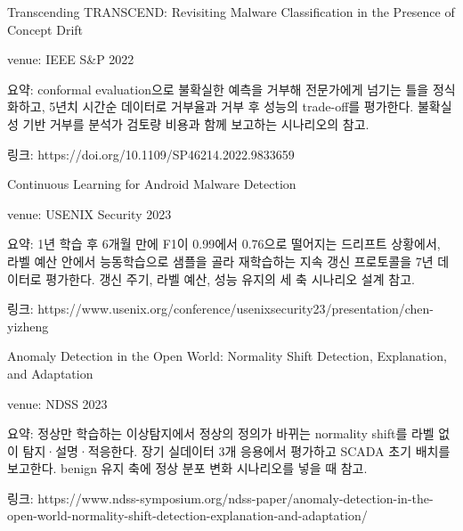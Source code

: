 \par\noindent \textbullet\enspace Transcending TRANSCEND: Revisiting Malware Classification in the Presence of Concept Drift


\par\noindent \textbullet\enspace venue: IEEE S\&P 2022


\par\noindent \textbullet\enspace 요약: conformal evaluation으로 불확실한 예측을 거부해 전문가에게 넘기는 틀을 정식화하고, 5년치 시간순 데이터로 거부율과 거부 후 성능의 trade-off를 평가한다. 불확실성 기반 거부를 분석가 검토량 비용과 함께 보고하는 시나리오의 참고.


\par\noindent \textbullet\enspace 링크: https:/\allowbreak{}/\allowbreak{}doi.org/\allowbreak{}10.1109/\allowbreak{}SP46214.2022.9833659


\par\noindent \textbullet\enspace Continuous Learning for Android Malware Detection


\par\noindent \textbullet\enspace venue: USENIX Security 2023


\par\noindent \textbullet\enspace 요약: 1년 학습 후 6개월 만에 F1이 0.99에서 0.76으로 떨어지는 드리프트 상황에서, 라벨 예산 안에서 능동학습으로 샘플을 골라 재학습하는 지속 갱신 프로토콜을 7년 데이터로 평가한다. 갱신 주기, 라벨 예산, 성능 유지의 세 축 시나리오 설계 참고.


\par\noindent \textbullet\enspace 링크: https:/\allowbreak{}/\allowbreak{}www.usenix.org/\allowbreak{}conference/\allowbreak{}usenixsecurity23/\allowbreak{}presentation/\allowbreak{}chen-yizheng


\par\noindent \textbullet\enspace Anomaly Detection in the Open World: Normality Shift Detection, Explanation, and Adaptation


\par\noindent \textbullet\enspace venue: NDSS 2023


\par\noindent \textbullet\enspace 요약: 정상만 학습하는 이상탐지에서 정상의 정의가 바뀌는 normality shift를 라벨 없이 탐지·설명·적응한다. 장기 실데이터 3개 응용에서 평가하고 SCADA 초기 배치를 보고한다. benign 유지 축에 정상 분포 변화 시나리오를 넣을 때 참고.


\par\noindent \textbullet\enspace 링크: https:/\allowbreak{}/\allowbreak{}www.ndss-symposium.org/\allowbreak{}ndss-paper/\allowbreak{}anomaly-detection-in-the-open-world-normality-shift-detection-explanation-and-adaptation/\allowbreak{}


